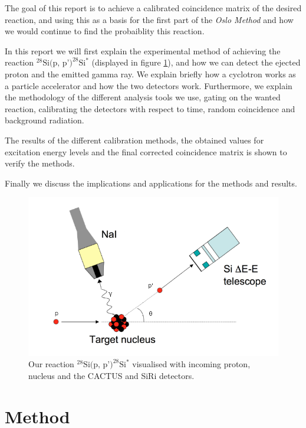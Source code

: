 \documentclass[a4paper,12pt]{article}
\begin{document}
The goal of this report is to achieve a calibrated
coincidence matrix of the desired reaction,
and using this as a basis for the first part of the \textit{Oslo Method}
and how we would continue to find the probaiblity this reaction.

In this report we will first explain the experimental method of
achieving the reaction
\noindent$^{28}\text{Si(p, p')}^{28}\text{Si}^*$ (displayed in figure
\ref{fig:28si}), and how we can detect the ejected proton and
the emitted gamma ray.
We explain briefly how a cyclotron works as a particle accelerator and
how the two detectors work.
Furthermore, we explain the methodology of the different analysis
tools we use, gating on the wanted reaction, calibrating
the detectors with respect to time, random coincidence 
and background radiation.

The results of the different calibration methods, the
obtained values for excitation energy levels
and the final corrected coincidence matrix is
shown to verify the methods.

Finally we discuss the implications and applications for the
methods and results.

\begin{figure}[h!]
    \centering
    \includegraphics[width=\columnwidth]{nucleus-fixed.png}
    \caption{Our reaction $^{28}\text{Si(p, p')}^{28}\text{Si}^*$ visualised
        with incoming proton, nucleus and the CACTUS and SiRi detectors.}
    \label{fig:28si}
\end{figure}

\section{Method}
\end{document}
